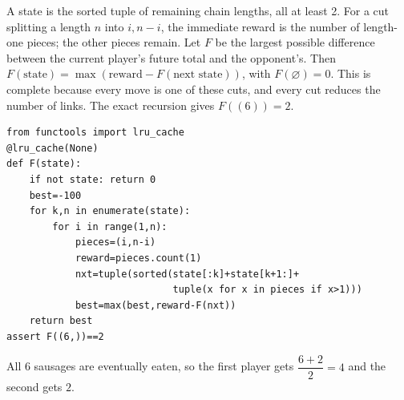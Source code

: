 A state is the sorted tuple of remaining chain lengths, all at least 2. For a cut splitting a length $n$ into $i,n-i$, the immediate reward is the number of length-one pieces; the other pieces remain. Let $F$ be the largest possible difference between the current player's future total and the opponent's. Then $F(\text{state})=\max(\text{reward}-F(\text{next state}))$, with $F(\varnothing)=0$. This is complete because every move is one of these cuts, and every cut reduces the number of links. The exact recursion gives $F((6))=2$.
\begin{verbatim}
from functools import lru_cache
@lru_cache(None)
def F(state):
    if not state: return 0
    best=-100
    for k,n in enumerate(state):
        for i in range(1,n):
            pieces=(i,n-i)
            reward=pieces.count(1)
            nxt=tuple(sorted(state[:k]+state[k+1:]+
                             tuple(x for x in pieces if x>1)))
            best=max(best,reward-F(nxt))
    return best
assert F((6,))==2
\end{verbatim}
All 6 sausages are eventually eaten, so the first player gets $\dfrac{6+2}{2}=\boxed4$ and the second gets $\boxed2$.
